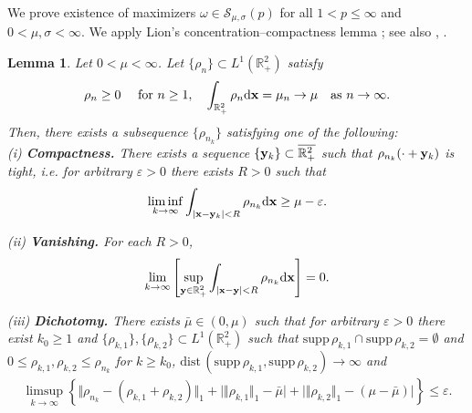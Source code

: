 \documentclass[11pt]{amsart}
\newtheorem{lemma}[theorem]{Lemma}
\theoremstyle{definition}
\theoremstyle{definition}
\numberwithin{equation}{section}
\newcommand{\nrm}[1]{\Vert#1\Vert}
\newcommand{\set}[1]{\{#1\}}
\newcommand{\dist}{\mathrm{dist}\,}
\newcommand{\supp}{{\mathrm{supp}}\,}
\newcommand{\0}{\emptyset}
\newcommand{\bfx}{{\bf x}}
\newcommand{\bfy}{{\bf y}}
\newcommand{\bbR}{\mathbb R}
\newcommand{\calS}{\mathcal S}
\newcommand{\dd}{\mathrm{d}}
\begin{document}
			We prove existence of maximizers $\omega \in \calS_{\mu, \sigma}(p)$ for all $1<p\leq \infty$ and $0<\mu, \sigma < \infty$. We apply Lion's concentration--compactness lemma \cite{Lions1984}; see also \cite[Lemma 1]{BNL2013}, \cite[Lemma 4.1]{AC2022}. 
			\begin{lemma}
				\label{lem:Lions lemma}
				Let $0<\mu<\infty$.
				Let $\set{\rho_n}\subset L^1(\bbR^2_+)$ satisfy
				\begin{align*}
					\rho_n\geq0 \quad \mbox{ for }n\geq 1,\quad \int_{\bbR^2_+}\rho_n \dd \bfx=\mu_n \to \mu \quad \textrm{as}\,\, n\to\infty.
				\end{align*}
				Then, there exists a subsequence $\set{\rho_{n_k}}$ satisfying one of the following: \\
				
				\noindent(i) \textbf{Compactness.} There exists a sequence $\set{\bfy_k}\subset\overline{\bbR^2_+}$ such that $\rho_{n_k}(\cdot+\bfy_k)$ is tight, i.e. for arbitrary $\varepsilon>0$ there exists $R>0$ such that 
				$$
				\liminf_{k\to\infty}\int_{|\bfx-\bfy_k|<R}\rho_{n_k} \dd \bfx \geq \mu-\varepsilon.$$
				
				\noindent(ii) \textbf{Vanishing.} For each $R>0$, 
				$$
				\lim_{k\to\infty}\left[\sup_{\bfy\in\bbR^2_+}\int_{|\bfx-\bfy|<R}\rho_{n_k} \dd \bfx\right]=0.
				$$
				
				\noindent(iii) \textbf{Dichotomy.} There exists $\bar{\mu}\in (0,\mu)$ such that for arbitrary $\varepsilon>0$ there exist $k_0\geq1$ and $\set{\rho_{k, 1}},\set{\rho_{k, 2}}\subset L^1(\bbR^2_+)$ such that $\supp{\rho_{k, 1}}\cap\supp{\rho_{k, 2}}=\0$ and $0\leq \rho_{k, 1},\rho_{k, 2} \leq \rho_{n_k}$ for $k\geq k_0$, $\dist(\supp{\rho_{k, 1}},\supp{\rho_{k, 2}})\to\infty$ and 
				\begin{align*}
					\limsup_{k\to\infty}\left\{ \nrm{\rho_{n_k}-(\rho_{k, 1}+\rho_{k, 2})}_1+\big|\nrm{\rho_{k, 1}}_1-\bar{\mu} \big|+\big| \nrm{\rho_{k, 2}}_1-(\mu-\bar{\mu})\big|\right\}\leq\varepsilon.
				\end{align*}
			\end{lemma}
			
\end{document}
